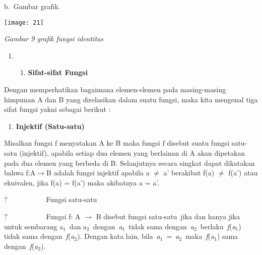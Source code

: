 \documentclass[11pt,fleqn]{book} %
\begin{document}
\begin{myEnumerate}
\begin{itemize}
\noindent 

\noindent 

\noindent 

\noindent 

\noindent 

\noindent 

\noindent 

\noindent 

\noindent b.~Gambar grafik.

\begin{center}
\noindent \texttt{[image: 21]}
\end{center}

\textit{Gambar 9 grafik fungsi identitas}

\noindent 

\begin{enumerate}
\item \begin{enumerate}
\item  \textbf{Sifat-sifat Fungsi}
\end{enumerate}
\end{enumerate}

Dengan memperhatikan bagaimana elemen-elemen pada masing-masing himpunan A dan B yang direlasikan dalam suatu fungsi, maka kita mengenal tiga sifat fungsi yakni sebagai berikut :



\begin{enumerate}
\item  \textbf{Injektif (Satu-satu)}
\end{enumerate}

\noindent 

\noindent Misalkan fungsi f menyatakan A ke B maka fungsi f disebut suatu fungsi satu-satu (injektif), apabila setiap dua elemen yang berlainan di A akan dipetakan pada dua elemen yang berbeda di B. Selanjutnya secara singkat dapat dikatakan bahwa f:A$\mathrm{\to}$B adalah fungsi injektif apabila a $\mathrm{\neq}$ a' berakibat f(a) $\mathrm{\neq}$ f(a') atau ekuivalen, jika f(a) = f(a') maka akibatnya a = a'.

\noindent 

\noindent ?~~~~~~~~~~~Fungsi satu-satu

\noindent ?~~~~~~~~~~~Fungsi f: A $\mathrm{\to}$ B disebut fungsi satu-satu~jika dan hanya jika untuk sembarang a${}_{1}$~dan a${}_{2}$~dengan~\textit{a${}_{1}$}~tidak sama dengan~\textit{a${}_{2}$}~berlaku~\textit{f}(\textit{a${}_{1}$}) tidak sama dengan~\textit{f}(\textit{a${}_{2}$}). Dengan kata lain, bila~\textit{a${}_{1}$}~=~\textit{a${}_{2}$}~maka~\textit{f}(\textit{a${}_{1}$}) sama dengan~\textit{f}(\textit{a${}_{2}$}).


\end{itemize}
\end{myEnumerate}
\end{document}
